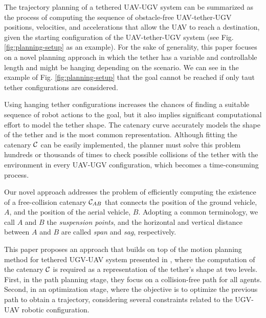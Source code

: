 The trajectory planning of a tethered UAV-UGV system can be summarized as the process of computing the sequence of obstacle-free UAV-tether-UGV positions, velocities, and accelerations that allow the UAV to reach a destination, given the starting configuration of the UAV-tether-UGV system (see Fig. \ref{fig:planning-setup} as an example). For the sake of generality, this paper focuses on a novel planning approach in which the tether has a variable and controllable length and might be hanging depending on the scenario. We can see in the example of Fig. \ref{fig:planning-setup} that the goal cannot be reached if only taut tether configurations are considered.

Using hanging tether configurations increases the chances of finding a suitable sequence of robot actions to the goal, but it also implies significant computational effort to model the tether shape. The catenary curve accurately models the shape of the tether and is the most common representation. Although fitting the catenary ${\cal C}$ can be easily implemented, the planner must solve this problem hundreds or thousands of times to check possible collisions of the tether with the environment in every UAV-UGV configuration, which becomes a time-consuming process. 

Our novel approach addresses the problem of efficiently computing the existence of a free-collision catenary ${\cal C}_{AB}$ that connects the position of the ground vehicle, $A$, and the position of the aerial vehicle, $B$. Adopting a common terminology, we call $A$ and $B$ the \emph{suspension points}, and the horizontal and vertical distance between $A$ and $B$ are called \emph{span} and \emph{sag}, respectively.

This paper proposes an approach that builds on top of the motion planning method for tethered UGV-UAV system presented in \cite{smartinezr2023}, where the computation of the catenary ${\cal C}$ is required as a representation of the tether's shape at two levels. First, in the path planning stage, they focus on a collision-free path for all agents. Second, in an optimization stage, where the objective is to optimize the previous path to obtain a trajectory, considering several constraints related to the UGV-UAV robotic configuration. 


